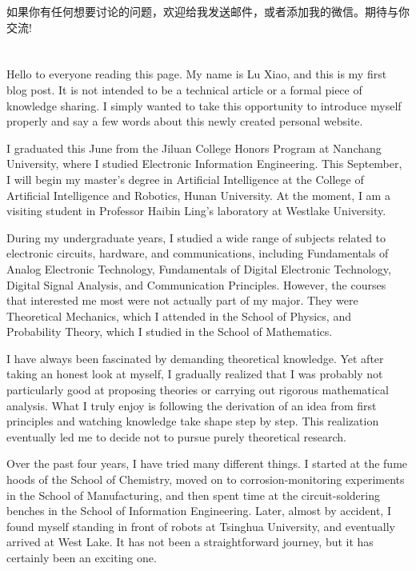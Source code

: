 \documentclass[UTF8,12pt,a4paper]{ctexart}
\begin{document}
	如果你有任何想要讨论的问题，欢迎给我发送邮件，或者添加我的微信。期待与你交流!
	
	\newpage
	\section*{}
	
	Hello to everyone reading this page. My name is Lu Xiao, and this is my first blog post. It is not intended to be a technical article or a formal piece of knowledge sharing. I simply wanted to take this opportunity to introduce myself properly and say a few words about this newly created personal website.
	
	I graduated this June from the Jiluan College Honors Program at Nanchang University, where I studied Electronic Information Engineering. This September, I will begin my master's degree in Artificial Intelligence at the College of Artificial Intelligence and Robotics, Hunan University. At the moment, I am a visiting student in Professor Haibin Ling's laboratory at Westlake University.
	
	During my undergraduate years, I studied a wide range of subjects related to electronic circuits, hardware, and communications, including Fundamentals of Analog Electronic Technology, Fundamentals of Digital Electronic Technology, Digital Signal Analysis, and Communication Principles. However, the courses that interested me most were not actually part of my major. They were Theoretical Mechanics, which I attended in the School of Physics, and Probability Theory, which I studied in the School of Mathematics.
	
	I have always been fascinated by demanding theoretical knowledge. Yet after taking an honest look at myself, I gradually realized that I was probably not particularly good at proposing theories or carrying out rigorous mathematical analysis. What I truly enjoy is following the derivation of an idea from first principles and watching knowledge take shape step by step. This realization eventually led me to decide not to pursue purely theoretical research.
	
	Over the past four years, I have tried many different things. I started at the fume hoods of the School of Chemistry, moved on to corrosion-monitoring experiments in the School of Manufacturing, and then spent time at the circuit-soldering benches in the School of Information Engineering. Later, almost by accident, I found myself standing in front of robots at Tsinghua University, and eventually arrived at West Lake. It has not been a straightforward journey, but it has certainly been an exciting one.
	
\end{document}
